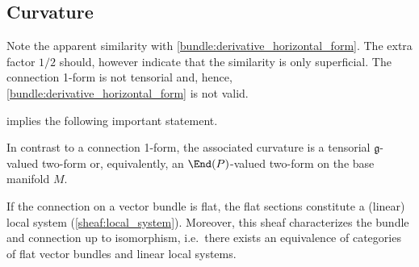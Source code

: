 \subsection{Curvature}


    \begin{remark}
        Note the apparent similarity with \cref{bundle:derivative_horizontal_form}. The extra factor $1/2$ should, however indicate that the similarity is only superficial. The connection 1-form is not tensorial and, hence, \cref{bundle:derivative_horizontal_form} is not valid.
    \end{remark}

     implies the following important statement.
    \begin{property}[Tensorial]
        In contrast to a connection 1-form, the associated curvature is a tensorial $\mathfrak{g}$-valued two-form or, equivalently, an $\End(P)$-valued two-form on the base manifold $M$.
    \end{property}


    \begin{property}
        If the connection on a vector bundle is flat, the flat sections constitute a (linear) local system (\cref{sheaf:local_system}). Moreover, this sheaf characterizes the bundle and connection up to isomorphism, i.e.~there exists an equivalence of categories of flat vector bundles and linear local systems.
    \end{property}

